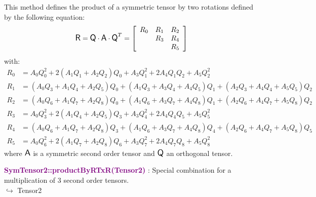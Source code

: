 This method defines the product of a symmetric tensor by two rotations defined by the following equation:
\begin{equation*}
\mbox{\large\ensuremath{\mathsf{R}}} = \mbox{\large\ensuremath{\mathsf{Q}}} \cdot \mbox{\large\ensuremath{\mathsf{A}}} \cdot \mbox{\large\ensuremath{\mathsf{Q}}}^T =\left[\begin{array}{ccc}
R_0&R_1&R_2\\
&R_3&R_4\\
&&R_5
\end{array}\right]
\end{equation*}
with:
\begin{align*}
R_0&=A_0 Q_0^2 + 2 (A_1 Q_1 + A_2 Q_2)Q_0 + A_3 Q_1^2 + 2 A_4 Q_1 Q_2 + A_5 Q_2^2\\
R_1&=(A_0 Q_3 + A_1 Q_4 + A_2 Q_5)Q_0 + (A_1 Q_3 + A_3 Q_4 + A_4 Q_5)Q_1 + (A_2 Q_3 + A_4 Q_4 + A_5 Q_5)Q_2\\
R_2&= (A_0 Q_6 + A_1 Q_7 + A_2 Q_8)Q_0 + (A_1 Q_6 + A_3 Q_7 + A_4 Q_8)Q_1 + (A_2 Q_6 + A_4 Q_7 + A_5 Q_8)Q_2\\
R_3&=A_0 Q_3^2 + 2 (A_1 Q_4 + A_2 Q_5)Q_3+ A_3 Q_4^2 + 2 A_4 Q_4 Q_5 + A_5 Q_5^2\\
R_4&= (A_0 Q_6 + A_1 Q_7 + A_2 Q_8)Q_3 + (A_1 Q_6 + A_3 Q_7 + A_4 Q_8)Q_4 + (A_2 Q_6 + A_4 Q_7 + A_5 Q_8)Q_5\\
R_5&=A_0 Q_6^2 + 2 (A_1 Q_7 + A_2 Q_8)Q_6+ A_3 Q_7^2 + 2 A_4 Q_7 Q_8 + A_5 Q_8^2
\end{align*}
where $\mbox{\large\ensuremath{\mathsf{A}}}$ is a symmetric second order tensor and $\mbox{\large\ensuremath{\mathsf{Q}}}$ an orthogonal tensor.

\textcolor{purple}{\textbf{SymTensor2::productByRTxR(Tensor2)}}\label{SymTensor2::productByRTxR(Tensor2)} : Special combination for a multiplication of 3 second order tensors.\\ \hspace*{5mm}$\hookrightarrow$ Tensor2

